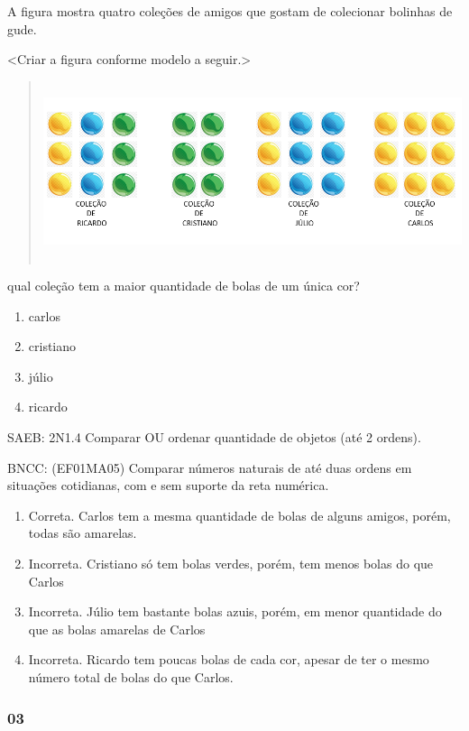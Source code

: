 A figura mostra quatro coleções de amigos que gostam de colecionar
bolinhas de gude.

\textless{}Criar a figura conforme modelo a seguir.\textgreater{}

\begin{quote}
\includegraphics[width=5.90556in,height=2.07014in]{media/image12.png}
\end{quote}

qual coleção tem a maior quantidade de bolas de um única cor?

\begin{enumerate}
\def\labelenumi{\Alph{enumi})}
\item
  carlos
\item
  cristiano
\item
  júlio
\item
  ricardo
\end{enumerate}

SAEB: 2N1.4 Comparar OU ordenar quantidade de objetos (até 2 ordens).

BNCC: (EF01MA05) Comparar números naturais de até duas ordens em
situações cotidianas, com e sem suporte da reta numérica.

\begin{enumerate}
\def\labelenumi{\alph{enumi})}
\item
  Correta. Carlos tem a mesma quantidade de bolas de alguns amigos,
  porém, todas são amarelas.
\item
  Incorreta. Cristiano só tem bolas verdes, porém, tem menos bolas do
  que Carlos
\item
  Incorreta. Júlio tem bastante bolas azuis, porém, em menor quantidade
  do que as bolas amarelas de Carlos
\item
  Incorreta. Ricardo tem poucas bolas de cada cor, apesar de ter o mesmo
  número total de bolas do que Carlos.
\end{enumerate}

\subsubsection{03 }\label{section-6}

